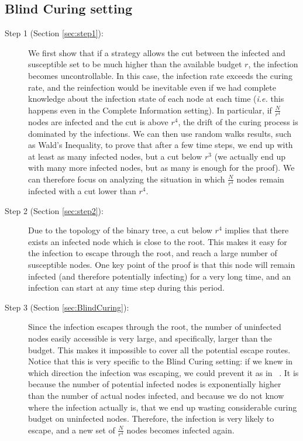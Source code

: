 \subsection{Blind Curing setting}
\begin{description}
\item[Step 1 (Section \ref{sec:step1}):] We first show that if a strategy allows the cut between the infected and susceptible set to be much higher than the available budget $r$, the infection becomes uncontrollable. In this case, the infection rate exceeds the curing rate, and the reinfection would be inevitable even if we had complete knowledge about the infection state of each node at each time (\textit{i.e.} this happens even in the Complete Information setting). In particular, if $\frac{N}{r^4}$ nodes are infected and the cut is above $r^4$, the drift of the curing process is dominated by the infections. We can then use random walks results, such as Wald's Inequality, to prove that after a few time steps, we end up with at least as many infected nodes, but a cut below $r^3$ (we actually end up with many more infected nodes, but as many is enough for the proof). We can therefore focus on analyzing the situation in which $\frac{N}{r^4}$ nodes remain infected with a cut lower than $r^4$.

\item[Step 2 (Section \ref{sec:step2}):] Due to the topology of the binary tree, a cut below $r^4$ implies that there exists an infected node which is close to the root. This makes it easy for the infection to escape through the root, and reach a large number of susceptible nodes. One key point of the proof is that this node will remain infected (and therefore potentially infecting) for a very long time, and an infection can start at any time step during this period.

\item[Step 3 (Section \ref{sec:BlindCuring}):] Since the infection escapes through the root, the number of uninfected nodes easily accessible is very large, and specifically, larger than the budget. This makes it impossible to cover all the potential escape routes. Notice that this is very specific to the Blind Curing setting: if we knew in which direction the infection was escaping, we could prevent it as in ~\cite{Drakopoulos2015a}. It is because the number of potential infected nodes is exponentially higher than the number of actual nodes infected, and because we do not know where the infection actually is, that we end up wasting considerable curing budget on uninfected nodes. Therefore, the infection is very likely to escape, and a new set of $\frac{N}{r^4}$ nodes becomes infected again.
\end{description}


